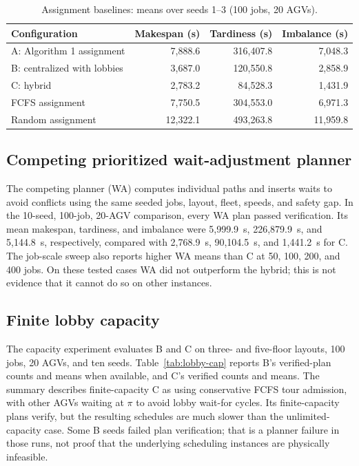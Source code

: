 \documentclass[11pt]{article}
\begin{document}
\begin{table}[htbp]
\centering
\small
\caption{Assignment baselines: means over seeds 1--3 (100 jobs, 20 AGVs).}
\label{tab:assign}
\begin{tabular}{lrrr}
\toprule
Configuration & Makespan (s) & Tardiness (s) & Imbalance (s) \\
\midrule
A: Algorithm 1 assignment & 7,888.6 & 316,407.8 & 7,048.3 \\
B: centralized with lobbies & 3,687.0 & 120,550.8 & 2,858.9 \\
C: hybrid & 2,783.2 & 84,528.3 & 1,431.9 \\
FCFS assignment & 7,750.5 & 304,553.0 & 6,971.3 \\
Random assignment & 12,322.1 & 493,263.8 & 11,959.8 \\
\bottomrule
\end{tabular}
\end{table}

\subsection{Competing prioritized wait-adjustment planner}

The competing planner (WA) computes individual paths and inserts waits to
avoid conflicts using the same seeded jobs, layout, fleet, speeds, and safety
gap. In the 10-seed, 100-job, 20-AGV comparison, every WA plan passed
verification. Its mean makespan, tardiness, and imbalance were 5,999.9~s,
226,879.9~s, and 5,144.8~s, respectively, compared with 2,768.9~s,
90,104.5~s, and 1,441.2~s for C. The job-scale sweep also reports higher WA
means than C at 50, 100, 200, and 400 jobs. On these tested cases WA did not
outperform the hybrid; this is not evidence that it cannot do so on other
instances.

\subsection{Finite lobby capacity}

The capacity experiment evaluates B and C on three- and five-floor layouts,
100 jobs, 20 AGVs, and ten seeds. Table~\ref{tab:lobby-cap} reports B's
verified-plan counts and means when available, and C's verified counts and
means. The summary describes finite-capacity C as using conservative FCFS
tour admission, with other AGVs waiting at $\pi$ to avoid lobby wait-for
cycles. Its finite-capacity plans verify, but the resulting schedules are
much slower than the unlimited-capacity case. Some B seeds failed plan
verification; that is a planner failure in those runs, not proof that the
underlying scheduling instances are physically infeasible.
\end{document}
